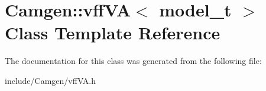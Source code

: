 \hypertarget{a00592}{}\section{Camgen\+:\+:vff\+V\+A$<$ model\+\_\+t $>$ Class Template Reference}
\label{a00592}


The documentation for this class was generated from the following file\+:\begin{DoxyCompactItemize}
\item 
include/\+Camgen/vff\+V\+A.\+h\end{DoxyCompactItemize}
